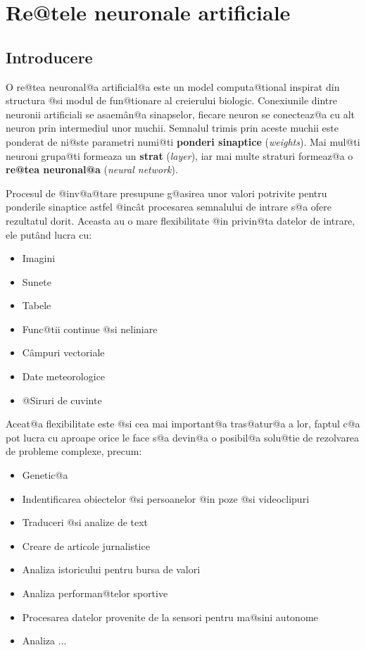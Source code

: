 	

\chapter{Re@tele neuronale artificiale}



\section{Introducere}



O re@tea neuronal@a artificial@a este un model computa@tional inspirat din structura @si modul de fun@tionare al creierului biologic. Conexiunile dintre neuronii artificiali se asaem\^ an@a sinapselor, fiecare neuron se conecteaz@a cu alt neuron prin intermediul unor muchii. Semnalul trimis prin aceste muchii este ponderat de ni@ste parametri numi@ti \textbf{ponderi sinaptice} (\textsl{weights}). Mai mul@ti neuroni grupa@ti formeaza un \textbf{strat} (\textsl{layer}), iar mai multe straturi formeaz@a o \textbf{re@tea neuronal@a} (\textsl{neural network}).

Procesul de @inv@a@tare presupune g@asirea unor valori potrivite pentru ponderile sinaptice astfel @inc\^ at procesarea semnalului de intrare s@a ofere rezultatul dorit. Aceasta au o mare flexibilitate @in privin@ta datelor de intrare, ele put\^ and lucra cu:

\begin{itemize}
	\item Imagini
	\item Sunete
	\item Tabele
	\item Func@tii continue @si neliniare
	\item C\^ ampuri vectoriale
	\item Date meteorologice
	\item @Siruri de cuvinte
\end{itemize}

Aceat@a flexibilitate este @si cea mai important@a tras@atur@a a lor, faptul c@a pot lucra cu aproape orice le face s@a devin@a o posibil@a solu@tie de rezolvarea de probleme complexe, precum: 

\begin{itemize}
	\item Genetic@a
	\item Indentificarea obiectelor @si persoanelor @in poze @si videoclipuri
	\item Traduceri @si analize de text
	\item Creare de articole jurnalistice
	\item Analiza istoricului pentru bursa de valori
	\item Analiza performan@telor sportive
	\item Procesarea datelor provenite de la sensori pentru ma@sini autonome
	\item Analiza ...
\end{itemize}

